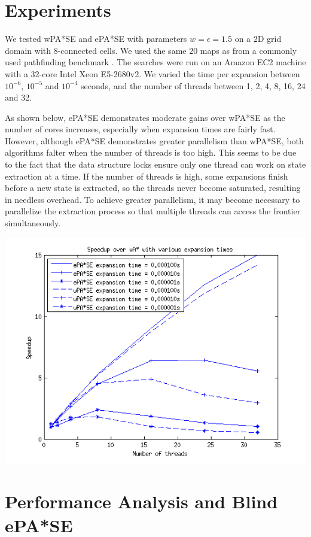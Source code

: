 \documentclass[letterpaper]{article}
\begin{document}
\section{Experiments}

We tested wPA*SE and ePA*SE with parameters $w=\epsilon=1.5$ on a 2D grid domain with 8-connected cells. We used the same 20 maps as \cite{phillips2014pa} from a commonly used pathfinding benchmark \cite{sturtevant2012benchmarks}. The searches were run on an Amazon EC2 machine with a 32-core Intel Xeon E5-2680v2. We varied the time per expansion between $10^{-6}$, $10^{-5}$ and $10^{-4}$ seconds, and the number of threads between 1, 2, 4, 8, 16, 24 and 32.

As shown below, ePA*SE demonstrates moderate gains over wPA*SE as the number of cores increases, especially when expansion times are fairly fast. However, although ePA*SE demonstrates greater parallelism than wPA*SE, both algorithms falter when the number of threads is too high. This seems to be due to the fact that the data structure locks ensure only one thread can work on state extraction at a time. If the number of threads is high, some expansions finish before a new state is extracted, so the threads never become saturated, resulting in needless overhead. To achieve greater parallelism, it may become necessary to parallelize the extraction process so that multiple threads can access the frontier simultaneously.

\includegraphics[scale=0.5]{time_sweep_all.png}

\section{Performance Analysis and Blind ePA*SE}
\end{document}
